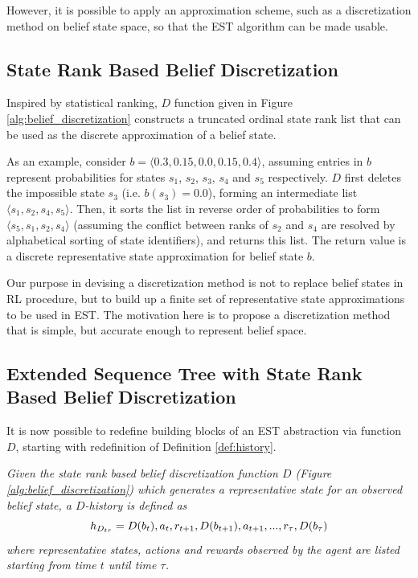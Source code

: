 \documentclass[10pt, conference, compsocconf]{IEEEtran}
\begin{document}
However, it is possible to apply an approximation scheme, such as a discretization method on belief state space, so that the EST algorithm can be made usable.

\subsection{State Rank Based Belief Discretization}
\label{sec:state_rank_discretization}

Inspired by statistical ranking, $D$ function given in Figure \ref{alg:belief_discretization} constructs a truncated ordinal state rank list that can be used as the discrete approximation of a belief state.

As an example, consider $b=\langle 0.3, 0.15, 0.0, 0.15, 0.4 \rangle$, assuming entries in $b$ represent probabilities for states $s_1$, $s_2$, $s_3$, $s_4$ and $s_5$ respectively. $D$ first deletes the impossible state $s_3$ (i.e. $b(s_3)=0.0$), forming an intermediate list $\langle s_1, s_2, s_4, s_5 \rangle$. Then, it sorts the list in reverse order of probabilities to form $\langle s_5, s_1, s_2, s_4 \rangle$  (assuming the conflict between ranks of $s_2$ and $s_4$ are resolved by alphabetical sorting of state identifiers), and returns this list. The return value is a discrete representative state approximation for belief state $b$.

Our purpose in devising a discretization method is not to replace belief states in RL procedure, but to build up a finite set of representative state approximations to be used in EST. The motivation here is to propose a discretization method that is simple, but accurate enough to represent belief space.


\subsection{Extended Sequence Tree with State Rank Based Belief Discretization}
\label{sec:u-extended_seq_tree}

It is now possible to redefine building blocks of an EST abstraction via function $D$, starting with redefinition of Definition \ref{def:history}.

\begin{definition}
\label{def:new_history}
\textit{Given the state rank based belief discretization function $D$ (Figure \ref{alg:belief_discretization}) which generates a representative state for an observed belief state, a $D$-history is defined as}
\begin{displaymath}
h_{{D}_{t\tau}}=D(b_t), a_t, r_{t+1}, D(b_{t+1}),  a_{t+1}, ..., r_{\tau},\\D(b_{\tau})
\end{displaymath}
\textit{where representative states, actions and rewards observed by the agent are listed starting from time $t$ until time $\tau$.}
\end{definition}
\end{document}
